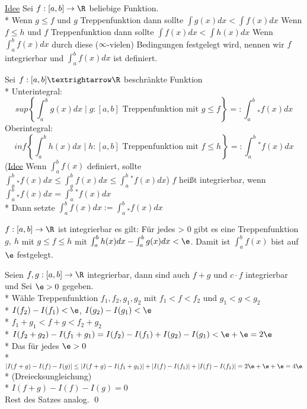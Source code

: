 \ul{Idee} Sei $f: [a, b] \to \R$ beliebige Funktion.\\*
Wenn $g \leq f$ und $g$ Treppenfunktion dann sollte $\int g(x)dx < \int f(x)dx$
Wenn $f \leq h$ und $f$ Treppenfunktion dann sollte $\int f(x)dx < \int h(x)dx$
Wenn $\int^b_a f(x)dx$ durch diese ($\infty$-vielen) Bedingungen festgelegt wird, nennen wir $f$ integrierbar und $\int_a^b f(x) dx$ ist definiert.

Sei $f:[a,b]→\R$ beschränkte Funktion\\*
Unterintegral:
$$sup \left\{\int_a^b g(x)dx\mid g:[a,b]\text{ Treppenfunktion mit }g\leq f\right\}=:\int_a^b{}_* f(x)dx$$
Oberintegral:
$$inf \left\{\int_a^b h(x)dx\mid h:[a,b]\text{ Treppenfunktion mit }f\leq h\right\}=:\int_a^b{}^* f(x)dx$$
(\ul{Idee} Wenn $\int_a^b f(x)$ definiert, sollte $ \int_a^b{}_* f(x)dx\leq \int_a^b f(x)dx \leq \int_a^b{}^* f(x)dx $)
$f$ heißt integrierbar, wenn $\int_a^b{}_* f(x)dx=\int_a^b{}^* f(x)dx$\\*
Dann setzte $\int_a^b f(x)dx:=\int_a^b{}_* f(x)dx$

$f:[a,b] \to \R$ ist integrierbar \equ{} es gilt: Für jedes \e > 0 gibt es eine Treppenfunktion $g,\ h$ mit $g \leq f \leq h$ mit $\int_a^b h(x)dx - \int_a^b g(x)dx < \e$. Damit ist $\int_a^b f(x)$ bist auf $\e$ festgelegt.

Seien $f, g: [a, b] \to \R$ integrierbar, dann sind auch $f + g$ und $c \cdot f$ integrierbar und
\bew
{}
Sei $\e > 0$ gegeben.\\*
Wähle Treppenfunktion $f_1, f_2, g_1, g_2$ mit $f_1 < f < f_2$ und $g_1 < g < g_2$\\*
$I(f_2) - I(f_1) < \e$, $I(g_2) - I(g_1) < \e$\\*
\Larr{} $f_1 + g_1 < f + g < f_2 + g_2$\\*
$I(f_2 + g_2) - I(f_1 + g_1) = I(f_2) - I(f_1) + I(g_2) - I(g_1) < \e + \e = 2\e$\\*
Das für jedes $\e > 0$ \\*
$|I(f + g) - I(f) - I(g)| \leq |I(f + g) - I(f_1 + g_1)| + |I(f) - I(f_1)| + |I(f) - I(f_1)| = 2\e + \e + \e = 4\e$\\*
(Dreiecksungleichung)\\*
\Rarr{} $I(f + g) - I(f) - I(g) = 0$\\
Rest des Satzes analog. \qed{}

